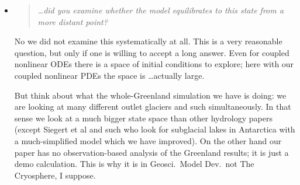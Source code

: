 \documentclass[11pt,reqno]{amsart}
\newcommand{\reply}[2]{
\medskip\medskip
\item  \begin{quote}
\emph{#1}
\end{quote}

\medskip
\noindent #2}
\begin{document}
\begin{itemize}
\reply{\dots did you examine whether the model equilibrates to this state from a more distant point?}{No we did not examine this systematically at all.  This is a very reasonable question, but only if one is willing to accept a long answer.  Even for coupled nonlinear ODEs there is a space of initial conditions to explore; here with our coupled nonlinear PDEs the space is \dots actually large.

\medskip
But think about what the whole-Greenland simulation we have is doing: we are looking at many different outlet glaciers and such simultaneously.  In that sense we look at a much bigger state space than other hydrology papers (except Siegert et al and such who look for subglacial lakes in Antarctica with a much-simplified model which we have improved).  On the other hand our paper has no observation-based analysis of the Greenland results; it is just a demo calculation.  This is why it is in Geosci.~Model Dev.~not The Cryosphere, I suppose.}
\end{itemize}
\end{document}
